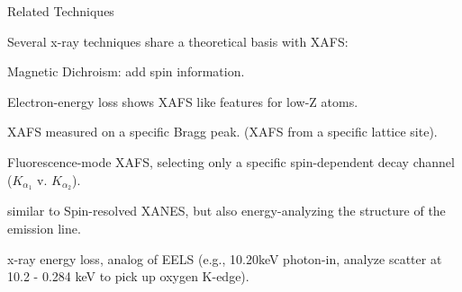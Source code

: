 \begin{slide}{Related Techniques}

    \vmm
    
    Several x-ray techniques share a theoretical basis with XAFS:

    \begin{description}
      \settowidth{\labelwidth}{15mm}  \setlength{\itemindent}{15mm}  \setlength{\leftmargin}{15mm}
      \pause
    \item[{{XMCD}}]   Magnetic Dichroism: add spin information.
      \pause

    \item[{{EELS}}] Electron-energy loss shows XAFS like features for low-Z
      atoms.

      \pause
    \item[{{DAFS}}] XAFS measured on a specific Bragg peak.
      (XAFS from a specific lattice site).

      \pause
    \item[{{Spin-Resolved XANES}}]  Fluorescence-mode XAFS, selecting
      only a specific spin-dependent decay channel ($K_{\alpha_1}$
      v. $K_{\alpha_2}$).

      \pause
    \item[{{RIXS}}] similar to Spin-resolved XANES, but also
      energy-analyzing the structure of the emission line.

    \item[{{X-Ray Raman}}] x-ray energy loss, analog of EELS (e.g.,
      10.20keV photon-in, analyze scatter at 10.2 - 0.284 keV to pick up
      oxygen K-edge). 
    
    \end{description}
\vfill
\end{slide} 
